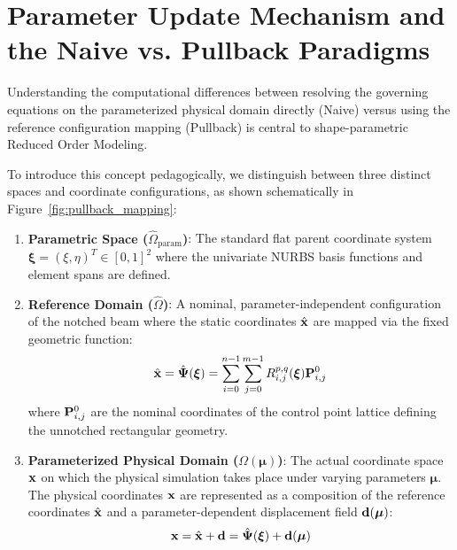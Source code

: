 \section{Parameter Update Mechanism and the Naive vs. Pullback Paradigms}
Understanding the computational differences between resolving the governing equations on the parameterized physical domain directly (Naive) versus using the reference configuration mapping (Pullback) is central to shape-parametric Reduced Order Modeling. 

To introduce this concept pedagogically, we distinguish between three distinct spaces and coordinate configurations, as shown schematically in Figure~\ref{fig:pullback_mapping}:
\begin{enumerate}
    \item \textbf{Parametric Space ($\hat{\Omega}_{\text{param}}$)}: The standard flat parent coordinate system $\boldsymbol{\xi} = (\xi, \eta)^T \in [0, 1]^2$ where the univariate NURBS basis functions and element spans are defined.
    \item \textbf{Reference Domain ($\hat{\Omega}$)}: A nominal, parameter-independent configuration of the notched beam where the static coordinates $\hat{\mathbf{x}}$ are mapped via the fixed geometric function:
          \begin{equation}
              \hat{\mathbf{x}} = \hat{\boldsymbol{\Psi}}(\boldsymbol{\xi}) = \sum_{i=0}^{n-1} \sum_{j=0}^{m-1} R_{i,j}^{p,q}(\boldsymbol{\xi}) \mathbf{P}_{i,j}^0
          \end{equation}
          where $\mathbf{P}_{i,j}^0$ are the nominal coordinates of the control point lattice defining the unnotched rectangular geometry.
    \item \textbf{Parameterized Physical Domain ($\Omega(\boldsymbol{\mu})$)}: The actual coordinate space $\mathbf{x}$ on which the physical simulation takes place under varying parameters $\boldsymbol{\mu}$. The physical coordinates $\mathbf{x}$ are represented as a composition of the reference coordinates $\hat{\mathbf{x}}$ and a parameter-dependent displacement field $\mathbf{d}(\boldsymbol{\mu})$:
          \begin{equation}
              \mathbf{x} = \hat{\mathbf{x}} + \mathbf{d} = \hat{\boldsymbol{\Psi}}(\boldsymbol{\xi}) + \mathbf{d}(\boldsymbol{\mu})
          \end{equation}
\end{enumerate}

